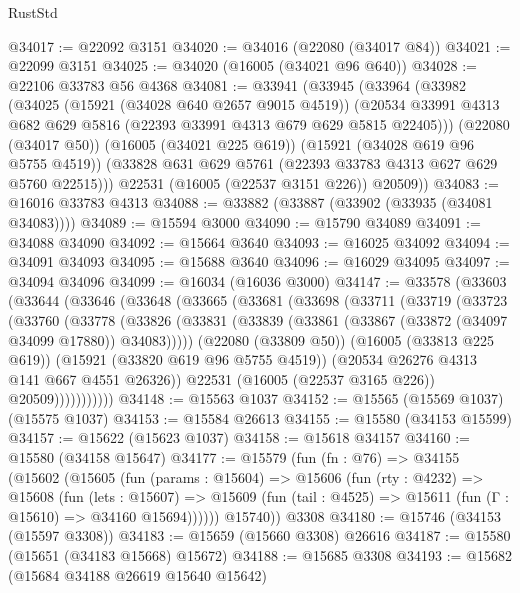 \begin{lexlean}{RustStd}
\begin{coremodule}
@34017 := @22092 @3151
@34020 := @34016 (@22080 (@34017 @84))
@34021 := @22099 @3151
@34025 := @34020 (@16005 (@34021 @96 @640))
@34028 := @22106 @33783 @56 @4368
@34081 := @33941
    (@33945
      (@33964
        (@33982
          (@34025
            (@15921 (@34028 @640 @2657 @9015 @4519))
            (@20534 @33991 @4313 @682 @629 @5816 (@22393 @33991 @4313 @679 @629 @5815 @22405)))
          (@22080 (@34017 @50))
          (@16005 (@34021 @225 @619))
          (@15921 (@34028 @619 @96 @5755 @4519))
          (@33828 @631 @629 @5761 (@22393 @33783 @4313 @627 @629 @5760 @22515)))
        @22531
        (@16005 (@22537 @3151 @226))
        @20509))
@34083 := @16016 @33783 @4313
@34088 := @33882 (@33887 (@33902 (@33935 (@34081 @34083))))
@34089 := @15594 @3000
@34090 := @15790 @34089
@34091 := @34088 @34090
@34092 := @15664 @3640
@34093 := @16025 @34092
@34094 := @34091 @34093
@34095 := @15688 @3640
@34096 := @16029 @34095
@34097 := @34094 @34096
@34099 := @16034 (@16036 @3000)
@34147 := @33578
    (@33603
      (@33644
        (@33646
          (@33648
            (@33665
              (@33681
                (@33698
                  (@33711
                    (@33719
                      (@33723
                        (@33760
                          (@33778
                            (@33826
                              (@33831
                                (@33839 (@33861 (@33867 (@33872 (@34097 @34099 @17880)) @34083)))))
                            (@22080 (@33809 @50))
                            (@16005 (@33813 @225 @619))
                            (@15921 (@33820 @619 @96 @5755 @4519))
                            (@20534 @26276 @4313 @141 @667 @4551 @26326))
                          @22531
                          (@16005 (@22537 @3165 @226))
                          @20509)))))))))))
@34148 := @15563 @1037
@34152 := @15565 (@15569 @1037) (@15575 @1037)
@34153 := @15584 @26613
@34155 := @15580 (@34153 @15599)
@34157 := @15622 (@15623 @1037)
@34158 := @15618 @34157
@34160 := @15580 (@34158 @15647)
@34177 := @15579
    (fun (fn : @76) =>
    @34155
      (@15602
        (@15605
          (fun (params : @15604) =>
          @15606
            (fun (rty : @4232) =>
            @15608
              (fun (lets : @15607) =>
              @15609 (fun (tail : @4525) => @15611 (fun (Γ : @15610) => @34160 @15694))))))
        @15740))
    @3308
@34180 := @15746 (@34153 (@15597 @3308))
@34183 := @15659 (@15660 @3308) @26616
@34187 := @15580 (@15651 (@34183 @15668) @15672)
@34188 := @15685 @3308
@34193 := @15682 (@15684 @34188 @26619 @15640 @15642)

\end{coremodule}
\end{lexlean}
